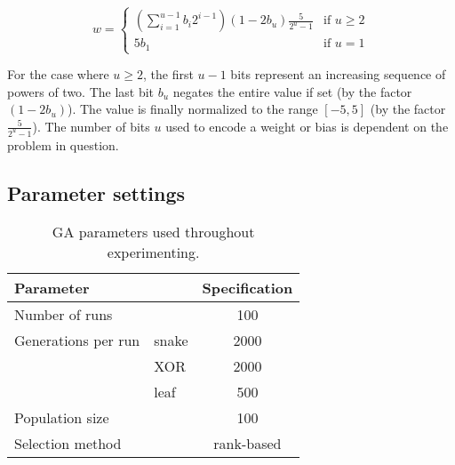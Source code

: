 \begin{equation*}\label{eq:weightdecoding}
  w =
  \begin{cases}
    \left(\sum_{i=1}^{u-1}b_i2^{i-1}\right)\left(1-2b_u\right)\frac{5}{2^u-1}  & \text{if } u \geq 2 \\
    5b_1                                                        & \text{if } u = 1
  \end{cases}
\end{equation*}

For the case where $u \geq 2$, the first $u-1$ bits represent an increasing sequence of powers of two. The last bit $b_u$ negates the entire value if set (by the factor $(1-2b_u)$). The value is finally normalized to the range $[-5, 5]$ (by the factor $\frac{5}{2^u-1}$).
The number of bits $u$ used to encode a weight or bias is dependent on the problem in question.





\subsection{Parameter settings}

\begin{table}
  \centering
  \begin{tabular}{l l S}
    \toprule
    Parameter & & {Specification} \\
    \midrule
    Number of runs & & 100 \\
    Generations per run & snake & 2000 \\
    & XOR & 2000 \\
    & leaf & 500 \\
    Population size & & 100 \\
    Selection method & & {rank-based} \\
    \bottomrule
  \end{tabular}
  \caption{GA parameters used throughout experimenting.}
  \label{tab:gaparam}
\end{table}

